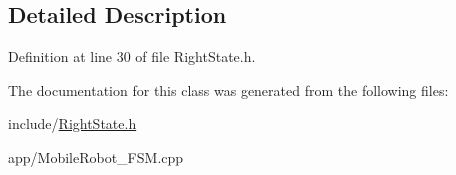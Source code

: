 \subsection{Detailed Description}


Definition at line 30 of file Right\+State.\+h.



The documentation for this class was generated from the following files\+:\begin{DoxyCompactItemize}
\item 
include/\mbox{\hyperlink{_right_state_8h}{Right\+State.\+h}}\item 
app/Mobile\+Robot\+\_\+\+F\+S\+M.\+cpp\end{DoxyCompactItemize}
